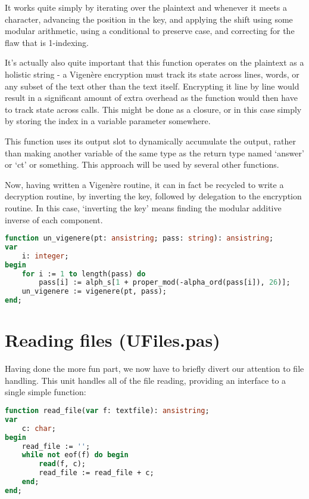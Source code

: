 \documentclass[fleqn,a4paper,11pt]{article}
\begin{document}
    It works quite simply by iterating over the plaintext and whenever it meets
    a character, advancing the position in the key, and applying the shift
    using some modular arithmetic, using a conditional to preserve case, and
    correcting for the flaw that is 1-indexing.

    It's actually also quite important that this function operates on the
    plaintext as a holistic string - a Vigen\`ere encryption must track its
    state across lines, words, or any subset of the text other than the text
    itself. Encrypting it line by line would result in a significant amount of
    extra overhead as the function would then have to track state across calls.
    This might be done as a closure, or in this case simply by storing the
    index in a variable parameter somewhere.

    This function uses its output slot to dynamically accumulate the output,
    rather than making another variable of the same type as the return type
    named `answer' or `ct' or something. This approach will be used by several
    other functions.

    Now, having written a Vigen\`ere routine, it can in fact be recycled to
    write a decryption routine, by inverting the key, followed by delegation to
    the encryption routine. In this case, `inverting the key' means finding the
    modular additive inverse of each component.

\begin{lstlisting}[language=Pascal, caption=Vigen\`ere decryption]
function un_vigenere(pt: ansistring; pass: string): ansistring;
var
    i: integer;
begin
    for i := 1 to length(pass) do
        pass[i] := alph_s[1 + proper_mod(-alpha_ord(pass[i]), 26)];
    un_vigenere := vigenere(pt, pass);
end;
\end{lstlisting}

    \section{Reading files (UFiles.pas)}
    Having done the more fun part, we now have to briefly divert our attention
    to file handling. This unit handles all of the file reading, providing an
    interface to a single simple function:

\begin{lstlisting}[language=Pascal, caption=File-reading routine]
function read_file(var f: textfile): ansistring;
var
    c: char;
begin
    read_file := '';
    while not eof(f) do begin
        read(f, c);
        read_file := read_file + c;
    end;
end;
\end{lstlisting}
\end{document}

